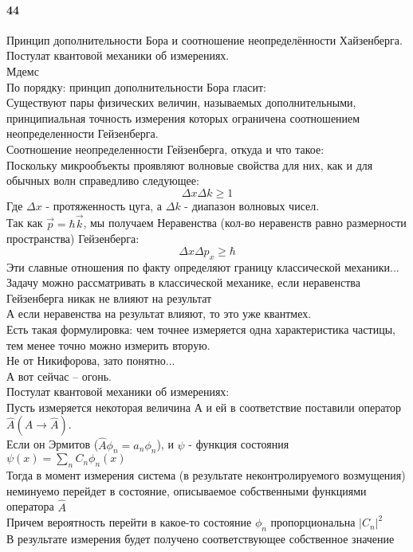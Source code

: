 


\paragraph{44}
Принцип дополнительности Бора и соотношение неопределённости Хайзенберга. Постулат квантовой механики об измерениях.\\

Мдемс\\
По порядку: принцип дополнительности Бора гласит:\\
Существуют пары физических величин, называемых дополнительными, принципиальная точность измерения которых ограничена соотношением неопределенности Гейзенберга.\\
Соотношение неопределенности Гейзенберга, откуда и что такое:\\
Поскольку микрообъекты проявляют волновые свойства для них, как и для обычных волн справедливо следующее:
$$\Delta x \Delta k \ge 1$$
Где $\Delta x $ - протяженность цуга, а $\Delta k$ - диапазон волновых чисел.\\
Так как $\vec{p}=\hbar\vec{k}$, мы получаем Неравенства (кол-во неравенств равно размерности пространства) Гейзенберга:
$$\Delta x \Delta p_x\ge\hbar$$
Эти славные отношения по факту определяют границу классической механики...\\
Задачу можно рассматривать в классической механике, если неравенства Гейзенберга никак не влияют на результат\\
А если неравенства на результат влияют, то это уже квантмех.\\
Есть такая формулировка: чем точнее измеряется одна характеристика частицы, тем менее точно можно измерить вторую.\\
Не от Никифорова, зато понятно...\\
А вот сейчас -- огонь.\\
Постулат квантовой механики об измерениях:\\
Пусть измеряется некоторая величина А и ей в соответствие поставили оператор $\hat{A}(A\rightarrow \hat{A})$.\\ Если он Эрмитов ($ \hat{A}\phi_n=a_n\phi_n$), и $\psi$ - функция состояния $\psi(x)=\sum\limits_n C_n \phi_n(x)$\\
Тогда в момент измерения система (в результате неконтролируемого возмущения) неминуемо перейдет в состояние, описываемое собственными функциями оператора $\hat{A}$\\
Причем вероятность перейти в какое-то состояние $\phi_n$ пропорциональна $|C_n|^2$\\
В результате измерения будет получено соответствующее собственное значение\\

